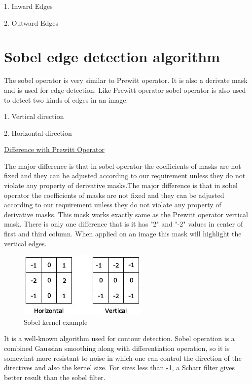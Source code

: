 \documentclass[BTech]{srmuthesis}
\begin{document}
1. Inward Edges

2. Outward Edges

\section{Sobel edge detection algorithm}  

The sobel operator is very similar to Prewitt operator. It is also a derivate mask and is used for edge detection. Like Prewitt operator sobel operator is also used to detect two kinds of edges in an image:

1. Vertical direction

2. Horizontal direction

\underline{Difference with Prewitt Operator}

The major difference is that in sobel operator the coefficients of masks are not fixed and they can be adjusted according to our requirement unless they do not violate any property of derivative masks.The major difference is that in sobel operator the coefficients of masks are not fixed and they can be adjusted according to our requirement unless they do not violate any property of derivative masks.
This mask works exactly same as the Prewitt operator vertical mask. There is only one difference that is it has "2" and "-2" values in center of first and third column. When applied on an image this mask will highlight the vertical edges.

\begin{figure}[h!]
    \centering
    \includegraphics[width=10cm\textwidth]{sobel-kernels1}
    \caption{Sobel kernel example}
    \label{fig:Sobel kernel}
\end{figure}

It is a well-known algorithm used for contour detection. Sobel operation is a combined Gaussian smoothing along with differentiation operation, so it is somewhat more resistant to noise in which one can control the direction of the directives and also the kernel size. For sizes less than -1, a Scharr filter gives better result than the sobel filter.
\end{document}
